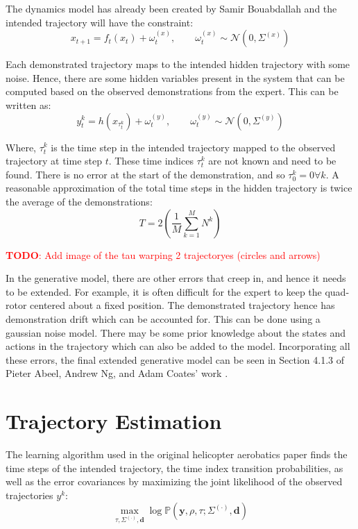 \documentclass[hidelinks,BTech]{iitmdiss}
\newcommand\todo[1]{\textcolor{red}{{\bf TODO}: #1}}
\begin{document}
The dynamics model has already been created by Samir Bouabdallah \cite{QuadrotorDynamics} and the intended trajectory will have the constraint:
\begin{equation}
  x_{t+1} = f_{t} (x_{t}) + {\omega}_{t}^{(x)}, \qquad \omega_t^{(x)} \sim \mathcal{N} (0, \Sigma^{(x)})
\end{equation}

Each demonstrated trajectory maps to the intended hidden trajectory with some noise. Hence, there are some hidden variables present in the system that can be computed based on the observed demonstrations from the expert. This can be written as:
\begin{equation}
  y_{t}^{k} = h(x_{\tau_t^k}) + {\omega}_{t}^{(y)}, \qquad \omega_t^{(y)} \sim \mathcal{N} (0, \Sigma^{(y)})
\end{equation}

Where, $\tau_t^k$ is the time step in the intended trajectory mapped to the observed trajectory at time step $t$. These time indices $\tau_t^k$ are not known and need to be found. There is no error at the start of the demonstration, and so $\tau_0^k = 0 \forall k$. A reasonable approximation of the total time steps in the hidden trajectory is twice the average of the demonstrations:
\begin{equation}
  T = 2 \left( \frac{1}{M} \sum_{k=1}^{M} N^k \right)
\end{equation}

\todo{Add image of the tau warping 2 trajectoryes (circles and arrows)}

In the generative model, there are other errors that creep in, and hence it needs to be extended. For example, it is often difficult for the expert to keep the quad-rotor centered about a fixed position. The demonstrated trajectory hence has demonstration drift which can be accounted for. This can be done using a gaussian noise model. There may be some prior knowledge about the states and actions in the trajectory which can also be added to the model. Incorporating all these errors, the final extended generative model can be seen in Section 4.1.3 of Pieter Abeel, Andrew Ng, and Adam Coates' work \cite{ApprenticeshipHelicopterAerobatics}.

\section{Trajectory Estimation}

The learning algorithm used in the original helicopter aerobatics paper \cite{ApprenticeshipHelicopterAerobatics} finds the time steps of the intended trajectory, the time index transition probabilities, as well as the error covariances by maximizing the joint likelihood of the observed trajectories $y^k$:
\begin{equation} \label{eq:ApprenticeshipJointProbability}
  \max_{\tau, \Sigma^{(\cdot)}, \mathbf{d}} \log \mathbb{P}(\mathbf{y}, \rho, \tau ; \Sigma^{(\cdot)}, \mathbf{d})
\end{equation}
\end{document}
